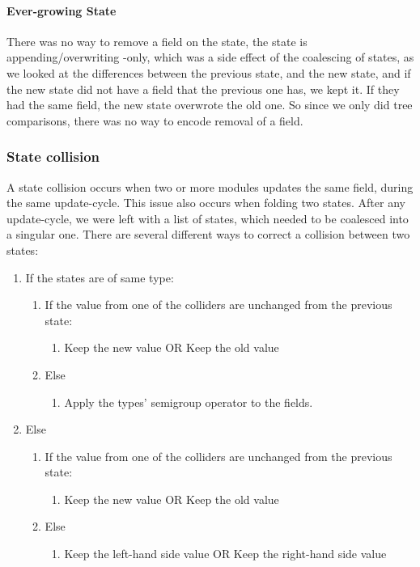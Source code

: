 \paragraph{Ever-growing State} There was no way to remove a field on the state,
the state is appending/overwriting -only, which was a side effect of the
coalescing of states, as we looked at the differences between the previous
state, and the new state, and if the new state did not have a field that the
previous one has, we kept it. If they had the same field, the new state
overwrote the old one. So since we only did tree comparisons, there was no way
to encode removal of a field.

\subsubsection{State collision} \label{sec:collision}

A state collision occurs when two or more modules updates the same field, during
the same update-cycle. This issue also occurs when folding two states. After any
update-cycle, we were left with a list of states, which needed to be coalesced
into a singular one. There are several different ways to correct a collision
between two states:

\begin{enumerate}
  \item If the states are of same type:
    \begin{enumerate}
      \item If the value from one of the colliders are unchanged from the previous state:
        \begin{enumerate}
          \item Keep the new value OR Keep the old value
        \end{enumerate}
      \item Else
        \begin{enumerate}
          \item Apply the types' semigroup operator to the fields.
        \end{enumerate}
    \end{enumerate}
  \item Else
    \begin{enumerate}
      \item If the value from one of the colliders are unchanged from the previous state:
        \begin{enumerate}
          \item Keep the new value OR Keep the old value
        \end{enumerate}
      \item Else
        \begin{enumerate}
          \item Keep the left-hand side value OR Keep the right-hand side value
        \end{enumerate}
    \end{enumerate}
\end{enumerate}

